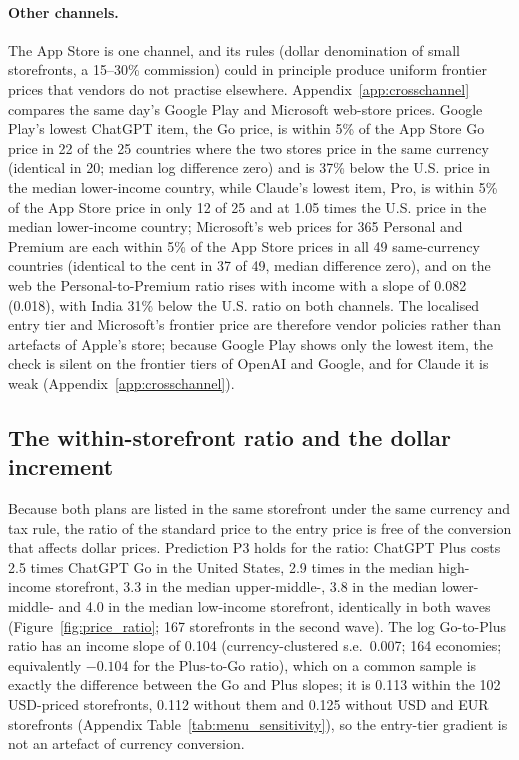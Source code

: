 \documentclass[11pt]{article}
\theoremstyle{definition}
\theoremstyle{remark}
\begin{document}
\paragraph{Other channels.} The App Store is one channel, and its rules (dollar denomination of small storefronts, a 15--30\% commission) could in principle produce uniform frontier prices that vendors do not practise elsewhere. Appendix~\ref{app:crosschannel} compares the same day's Google Play and Microsoft web-store prices. Google Play's lowest ChatGPT item, the Go price, is within 5\% of the App Store Go price in 22 of the 25 countries where the two stores price in the same currency (identical in 20; median log difference zero) and is 37\% below the U.S. price in the median lower-income country, while Claude's lowest item, Pro, is within 5\% of the App Store price in only 12 of 25 and at 1.05 times the U.S. price in the median lower-income country; Microsoft's web prices for 365 Personal and Premium are each within 5\% of the App Store prices in all 49 same-currency countries (identical to the cent in 37 of 49, median difference zero), and on the web the Personal-to-Premium ratio rises with income with a slope of 0.082 (0.018), with India 31\% below the U.S. ratio on both channels. The localised entry tier and Microsoft's frontier price are therefore vendor policies rather than artefacts of Apple's store; because Google Play shows only the lowest item, the check is silent on the frontier tiers of OpenAI and Google, and for Claude it is weak (Appendix~\ref{app:crosschannel}).

\subsection{The within-storefront ratio and the dollar increment}\label{sec:ratio}

Because both plans are listed in the same storefront under the same currency and tax rule, the ratio of the standard price to the entry price is free of the conversion that affects dollar prices. Prediction P3 holds for the ratio: ChatGPT Plus costs 2.5 times ChatGPT Go in the United States, 2.9 times in the median high-income storefront, 3.3 in the median upper-middle-, 3.8 in the median lower-middle- and 4.0 in the median low-income storefront, identically in both waves (Figure~\ref{fig:price_ratio}; 167 storefronts in the second wave). The log Go-to-Plus ratio has an income slope of 0.104 (currency-clustered s.e.\ 0.007; 164 economies; equivalently $-0.104$ for the Plus-to-Go ratio), which on a common sample is exactly the difference between the Go and Plus slopes; it is 0.113 within the 102 USD-priced storefronts, 0.112 without them and 0.125 without USD and EUR storefronts (Appendix Table~\ref{tab:menu_sensitivity}), so the entry-tier gradient is not an artefact of currency conversion.
\end{document}
